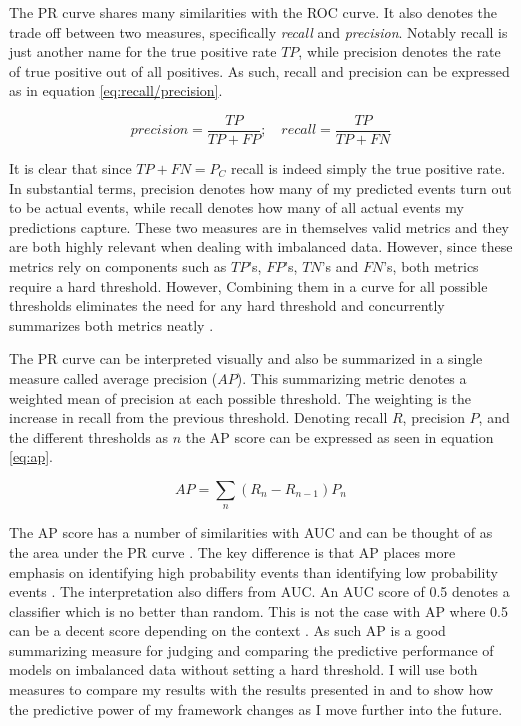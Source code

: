 \documentclass[a4paper]{article}
\begin{document}
The PR curve shares many similarities with the ROC curve. It also denotes the trade off between two measures, specifically \emph{recall} and \emph{precision}. Notably recall is just another name for the true positive rate $TP$, while precision denotes the rate of true positive out of all positives. As such, recall and
precision can be expressed as in equation \ref{eq:recall/precision}.\par%

\[
precision = \frac{TP}{TP+FP}; \quad recall = \frac{TP}{TP+FN} \tag{16} \label{eq:recall/precision}
\]


It is clear that since $TP+FN = P_C$ recall is indeed simply the true positive rate. In substantial terms, precision denotes how many of my predicted events turn out to be actual events, while recall denotes how many of all actual events my predictions capture. These two measures are in themselves valid metrics and they are both highly relevant when dealing with imbalanced data. However, since these metrics rely on components such as $TP$'s, $FP$'s, $TN$'s and $FN$'s, both metrics require a hard threshold. However, Combining them in a curve for all possible thresholds eliminates the need for any hard threshold and concurrently summarizes both metrics neatly \citep[1287]{He_2008}.\par

The PR curve can be interpreted visually and also be summarized in a single measure called average precision ($AP$). This summarizing metric denotes a weighted mean of precision at each possible threshold. The weighting is the increase in recall from the previous threshold. Denoting recall $R$, precision $P$, and the different thresholds as $n$ the AP score can be expressed as seen in equation \ref{eq:ap}.\par

\[
AP = \sum_n (R_n-R_{n-1})P_n \tag{17} \label{eq:ap}
\]

The AP score has a number of similarities with AUC and can be thought of as the area under the PR curve  \citep[349-350]{su2015relationship}. The key difference is that AP places more emphasis on identifying high probability events than identifying low probability events \citep[350]{su2015relationship}. The interpretation also differs from AUC. An AUC score of 0.5 denotes a classifier which is no better than random. This is not the case with AP where 0.5 can be a decent score depending on the context \citep[350-351]{su2015relationship}. As such AP is a good summarizing measure for judging and comparing the predictive performance of models on imbalanced data without setting a hard threshold. I will use both measures to compare my results with the results presented in \cite{Maase} and to show how the predictive power of my framework changes as I move further into the future.\par
\end{document}
